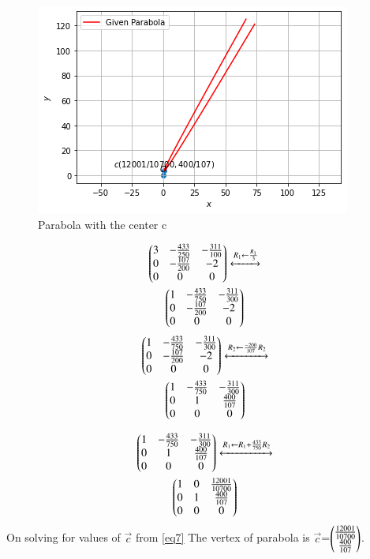 \documentclass[journal,12pt,twocolumn]{IEEEtran}
\begin{document}
\begin{figure}[!h]
    \centering
    \includegraphics[width=\columnwidth]{parabola.png}
    \caption{Parabola with the center c}
    \label{Fig:1}
\end{figure}
\begin{multline}
\begin{pmatrix}3 & -\frac{433}{250}&-\frac{311}{100}\\0 & -\frac{107}{200} & -2\\0& 0&0\end{pmatrix}\xleftrightarrow[]{R_1\leftarrow \frac{R_1}{{3}}}\\\begin{pmatrix}1& -\frac{433}{750}&-\frac{311}{300}\\0 & -\frac{107}{200} & -2\\0& 0&0\end{pmatrix}
\end{multline}
\begin{multline}
\begin{pmatrix}1 & -\frac{433}{750}&-\frac{311}{300}\\0 & -\frac{107}{200} & -2\\0& 0&0\end{pmatrix}\xleftrightarrow[]{R_2\leftarrow \frac{-200}{{107}}R_2}\\
\begin{pmatrix}1 & -\frac{433}{750}&-\frac{311}{300}\\0 & 1 & \frac{400}{107}\\0& 0&0\end{pmatrix}
\end{multline}

\begin{multline}
\begin{pmatrix}1 & -\frac{433}{750}&-\frac{311}{300}\\0 & 1 & \frac{400}{107}\\0& 0&0\end{pmatrix}\xleftrightarrow[]{R_1\leftarrow R_1+\frac{433}{{750}}R_2}\\
\begin{pmatrix}1 & 0&\frac{12001}{10700}\\0 & 1 & \frac{400}{107}\\0& 0&0\end{pmatrix}\label{eq7}
\end{multline}
On solving for values of $\vec{c}$ from \eqref{eq7} 
 The vertex of parabola is $\vec{c}$=$\begin{pmatrix}\frac{12001}{10700}\\\frac{400}{107}\end{pmatrix}$.
\end{document}
